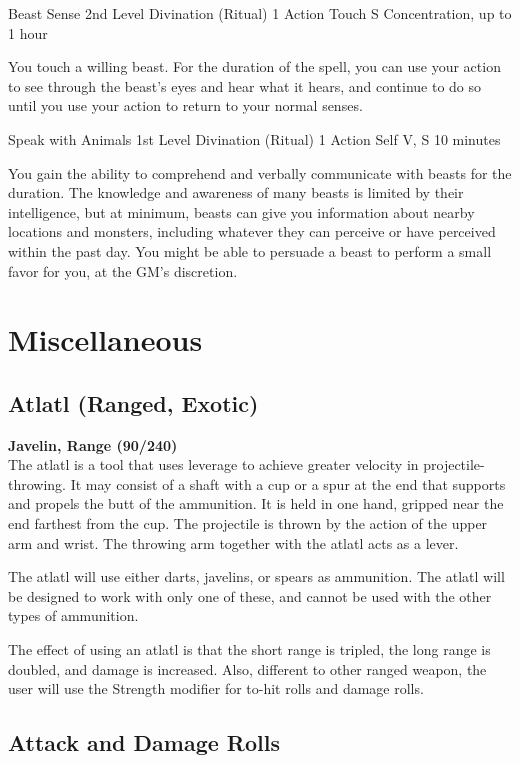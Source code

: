 \documentclass[letterpaper,openany,oneside,twocolumn]{book}
\begin{document}
\DndSpellHeader
  {Beast Sense}
  {2nd Level Divination (Ritual)}
  {1 Action}
  {Touch}
  {S}
  {Concentration, up to 1 hour}

You touch a willing beast. For the duration of the spell, you can use your action to see through the beast’s eyes and hear what it hears, and continue to do so until you use your action to return to your normal senses.

\DndSpellHeader
  {Speak with Animals}
  {1st Level Divination (Ritual)}
  {1 Action}
  {Self}
  {V, S}
  {10 minutes}

You gain the ability to comprehend and verbally communicate with beasts for the duration. The knowledge and awareness of many beasts is limited by their intelligence, but at minimum, beasts can give you information about nearby locations and monsters, including whatever they can perceive or have perceived within the past day. You might be able to persuade a beast to perform a small favor for you, at the GM’s discretion.

\section*{Miscellaneous}
\subsection*{Atlatl (Ranged, Exotic)}
\textbf{Javelin, Range (90/240)}\\
The atlatl is a tool that uses leverage to achieve greater velocity in projectile-throwing. It may consist of a shaft with a cup or a spur at the end that supports and propels the butt of the ammunition. It is held in one hand, gripped near the end farthest from the cup. The projectile is thrown by the action of the upper arm and wrist. The throwing arm together with the atlatl acts as a lever.

The atlatl will use either darts, javelins, or spears as ammunition. The atlatl will be designed to work with only one of these, and cannot be used with the other types of ammunition.

The effect of using an atlatl is that the short range is tripled, the long range is doubled, and damage is increased. Also, different to other ranged weapon, the user will use the Strength modifier for to-hit rolls and damage rolls.
\subsection*{Attack and Damage Rolls}
\end{document}
